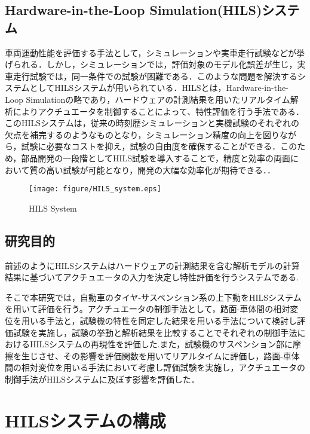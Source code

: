 \documentclass[a4paper,12pt]{article_vdlab_sotsuron}
\begin{document}
\subsection{Hardware-in-the-Loop Simulation(HILS)システム}
車両運動性能を評価する手法として，シミュレーションや実車走行試験などが挙げられる．しかし，シミュレーションでは，評価対象のモデル化誤差が生じ，実車走行試験では，同一条件での試験が困難である．このような問題を解決するシステムとしてHILSシステムが用いられている\cite{4}．HILSとは，Hardware-in-the-Loop Simulationの略であり，ハードウェアの計測結果を用いたリアルタイム解析によりアクチュエータを制御することによって、特性評価を行う手法である．このHILSシステムは，従来の時刻歴シミュレーションと実機試験のそれぞれの欠点を補完するのようなものとなり，シミュレーション精度の向上を図りながら，試験に必要なコストを抑え，試験の自由度を確保することができる．このため，部品開発の一段階としてHILS試験を導入することで，精度と効率の両面において質の高い試験が可能となり，開発の大幅な効率化が期待できる．\cite{5}．

\vspace*{10mm}
\begin{figure}[htp]
  \begin{center}
    \texttt{[image: figure/HILS\_system.eps]}
    \vspace*{3mm}
    \caption{HILS System\cite{6}}
    \label{fig:HILS_system}
  \end{center}
\end{figure}

\subsection{研究目的}
前述のようにHILSシステムはハードウェアの計測結果を含む解析モデルの計算結果に基づいてアクチュエータの入力を決定し特性評価を行うシステムである.
\par
そこで本研究では，自動車のタイヤ-サスペンション系の上下動をHILSシステムを用いて評価を行う。アクチュエータの制御手法として，路面-車体間の相対変位を用いる手法と，試験機の特性を同定した結果を用いる手法について検討し評価試験を実施し，試験の挙動と解析結果を比較することでそれぞれの制御手法におけるHILSシステムの再現性を評価した.また，試験機のサスペンション部に摩擦を生じさせ、その影響を評価関数を用いてリアルタイムに評価し，路面-車体間の相対変位を用いる手法において考慮し評価試験を実施し，アクチュエータの制御手法がHILSシステムに及ぼす影響を評価した．


\newpage
\section{HILSシステムの構成}
\end{document}
